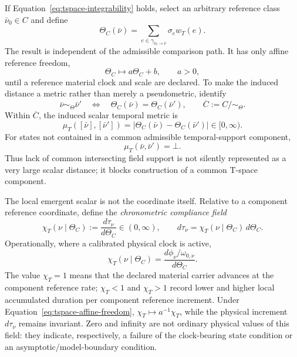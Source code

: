 \documentclass[11pt]{article}
\theoremstyle{definition}
\begin{document}
If Equation~\eqref{eq:tspace-integrability} holds, select an arbitrary reference
class $\bar\nu_0\in C$ and define
\begin{equation}
\Theta_C(\bar\nu)
=
\sum_{e\in\gamma_{\bar\nu_0\to\bar\nu}}\sigma_e w_T(e).
\label{eq:tspace-path-coordinate}
\end{equation}
The result is independent of the admissible comparison path. It has only affine
reference freedom,
\begin{equation}
\Theta_C\mapsto a\Theta_C+b,
\qquad a>0,
\label{eq:tspace-affine-freedom}
\end{equation}
until a reference material clock and scale are declared. To make the induced
distance a metric rather than merely a pseudometric, identify
\begin{equation}
\bar\nu\sim_{\Theta}\bar\nu'
\quad\Longleftrightarrow\quad
\Theta_C(\bar\nu)=\Theta_C(\bar\nu'),
\qquad
\overline C:=C/\sim_{\Theta}.
\label{eq:tspace-coordinate-quotient}
\end{equation}
Within $\overline C$, the induced scalar temporal metric is
\begin{equation}
\mu_T([\bar\nu],[\bar\nu'])
=
\left|\Theta_C(\bar\nu)-\Theta_C(\bar\nu')\right|
\in[0,\infty).
\label{eq:tspace-scalar-metric}
\end{equation}
For states not contained in a common admissible temporal-support component,
\begin{equation}
\mu_T(\bar\nu,\bar\nu')=\bot.
\label{eq:tspace-cross-component-undefined}
\end{equation}
Thus lack of common intersecting field support is not silently represented as a
very large scalar distance; it blocks construction of a common T-space component.

The local emergent scalar is not the coordinate itself. Relative to a component
reference coordinate, define the \emph{chronometric compliance field}
\begin{equation}
\chi_T(\nu\mid\Theta_C)
:=
\frac{d\tau_\nu}{d\Theta_C}
\in(0,\infty),
\qquad
d\tau_\nu=\chi_T(\nu\mid\Theta_C)\,d\Theta_C.
\label{eq:tspace-chronometric-compliance}
\end{equation}
Operationally, where a calibrated physical clock is active,
\begin{equation}
\chi_T(\nu\mid\Theta_C)
=
\frac{d\phi_\nu/\omega_{0,\nu}}{d\Theta_C}.
\label{eq:tspace-operational-compliance}
\end{equation}
The value $\chi_T=1$ means that the declared material carrier advances at the
component reference rate; $\chi_T<1$ and $\chi_T>1$ record lower and higher local
accumulated duration per component reference increment. Under
Equation~\eqref{eq:tspace-affine-freedom}, $\chi_T\mapsto a^{-1}\chi_T$, while
the physical increment $d\tau_\nu$ remains invariant. Zero and infinity are not
ordinary physical values of this field: they indicate, respectively, a failure of
the clock-bearing state condition or an asymptotic/model-boundary condition.
\end{document}
